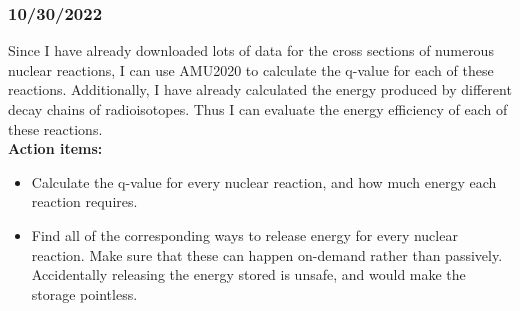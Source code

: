 \documentclass[12pt]{article}
\begin{document}
\subsubsection{10/30/2022}
Since I have already downloaded lots of data for the cross sections of numerous nuclear reactions, I can use AMU2020 to calculate the q-value for each of these reactions. Additionally, I have already calculated the energy produced by different decay chains of radioisotopes. Thus I can evaluate the energy efficiency of each of these reactions. \\
\textbf{Action items:}
\begin{itemize}
    \item Calculate the q-value for every nuclear reaction, and how much energy each reaction requires. 
    \item Find all of the corresponding ways to release energy for every nuclear reaction. Make sure that these can happen on-demand rather than passively. Accidentally releasing the energy stored is unsafe, and would make the storage pointless. 
\end{itemize}
\end{document}
